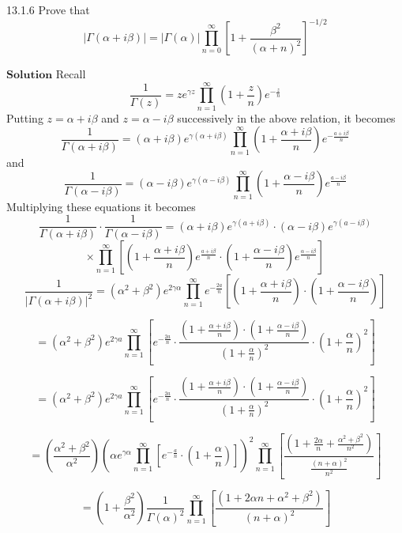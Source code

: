 \documentclass{article}
\begin{document}
\begin{flushleft}
\newpage

\begin{mybox}{13.1.6}
Prove that 
$$|\Gamma(\alpha+i \beta)|=|\Gamma(\alpha)| \prod_{n=0}^{\infty}\left[1+\frac{\beta^{2}}{(\alpha+n)^{2}}\right]^{-1 / 2}$$
\end{mybox}

$\boxed{\textbf{Solution}}$ Recall 
$$
\frac{1}{\Gamma(z)}=z e^{\gamma z} \prod_{n=1}^{\infty}\left(1+\frac{z}{n}\right) e^{-\frac{z}{n}}
$$
Putting $z=\alpha+i \beta$ and $z=\alpha-i \beta$ successively in the above relation, it becomes
$$
\frac{1}{\Gamma(\alpha+i \beta)}=(\alpha+i \beta) e^{\gamma(\alpha+i \beta)} \prod_{n=1}^{\infty}\left(1+\frac{\alpha+i \beta}{n}\right) e^{-\frac{a+i \beta}{n}}
$$
and 
$$
\frac{1}{\Gamma(\alpha-i \beta)}=(\alpha-i \beta) e^{\gamma(\alpha-i \beta)} \prod_{n=1}^{\infty}\left(1+\frac{\alpha-i \beta}{n}\right) e^{\frac{a-i \beta}{n}}
$$
Multiplying these equations it becomes
$$
\frac{1}{\Gamma(\alpha+i \beta)} \cdot \frac{1}{\Gamma(\alpha-i \beta)}=(\alpha+i \beta) e^{\gamma(a+i \beta)} \cdot(\alpha-i \beta) e^{\gamma(a-i \beta)}$$
$$\times \prod_{n=1}^{\infty}\left[\left(1+\frac{\alpha+i \beta}{n}\right) e^{\frac{a+i \beta}{n}} \cdot\left(1+\frac{\alpha-i \beta}{n}\right) e^{\frac{\alpha-i \beta}{n}}\right]
$$
$$
\frac{1}{|\Gamma(\alpha+i \beta)|^{2}}=\left(\alpha^{2}+\beta^{2}\right) e^{2\gamma \alpha} \prod_{n=1}^{\infty} e^{-\frac{2 a}{n}}\left[\left(1+\frac{\alpha+i \beta}{n}\right) \cdot\left(1+\frac{\alpha-i \beta}{n}\right)\right]
$$

$$
=\left(\alpha^{2}+\beta^{2}\right) e^{2 \gamma a} \prod_{n=1}^{\infty}\left[e^{-\frac{2 a}{n}} \cdot \frac{\left(1+\frac{\alpha+i \beta}{n}\right) \cdot\left(1+\frac{\alpha-i \beta}{n}\right)}{\left(1+\frac{\alpha}{n}\right)^{2}} \cdot\left(1+\frac{\alpha}{n}\right)^{2}\right]
$$

$$
=\left(\alpha^{2}+\beta^{2}\right) e^{2 \gamma a} \prod_{n=1}^{\infty}\left[e^{-\frac{2 a}{n}} \cdot \frac{\left(1+\frac{\alpha+i \beta}{n}\right) \cdot\left(1+\frac{\alpha-i \beta}{n}\right)}{\left(1+\frac{\alpha}{n}\right)^{2}} \cdot\left(1+\frac{\alpha}{n}\right)^{2}\right]
$$

$$
=\left(\frac{\alpha^{2}+\beta^{2}}{\alpha^{2}}\right)\left(\alpha e^{\gamma \alpha} \prod_{n=1}^{\infty}\left[e^{-\frac{a}{n}} \cdot\left(1+\frac{\alpha}{n}\right)\right]\right)^{2} \prod_{n=1}^{\infty}\left[\frac{\left(1+\frac{2 \alpha}{n}+\frac{\alpha^{2}+\beta^{2}}{n^{2}}\right)}{\frac{(n+\alpha)^{2}}{n^{2}}}\right]
$$


$$
=\left(1+\frac{\beta^{2}}{\alpha^{2}}\right) \frac{1}{\Gamma(\alpha)^{2}} \prod_{n=1}^{\infty}\left[\frac{\left(1+2 \alpha n+\alpha^{2}+\beta^{2}\right)}{(n+\alpha)^{2}}\right]
$$


\end{flushleft}
\end{document}
